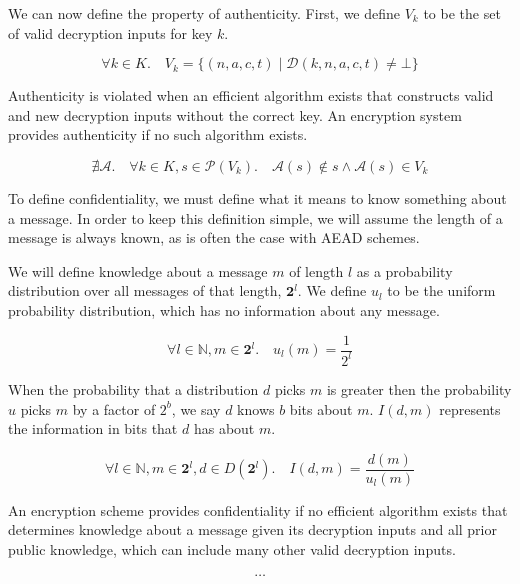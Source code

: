 We can now define the property of authenticity. First, we define $V_k$ to be the
set of valid decryption inputs for key $k$.

\begin{equation}
    \forall k \in K.\quad
    V_k = \{ (n, a, c, t) \mid \mathcal{D}(k, n, a, c, t) \neq \bot \}
\end{equation}

Authenticity is violated when an efficient algorithm exists that constructs
valid and new decryption inputs without the correct key. An encryption system
provides authenticity if no such algorithm exists.

\begin{equation}
    \nexists \mathcal{A}.\quad \forall k \in K, s \in \mathcal{P}(V_k).\quad
    \mathcal{A}(s) \notin s \wedge \mathcal{A}(s) \in V_k
\end{equation}

To define confidentiality, we must define what it means to know something about
a message. In order to keep this definition simple, we will assume the length of
a message is always known, as is often the case with AEAD schemes.

We will define knowledge about a message $m$ of length $l$ as a probability
distribution over all messages of that length, $\mathbf{2}^l$. We define $u_l$
to be the uniform probability distribution, which has no information about any
message.

\begin{equation}
    \forall l \in \mathbb{N}, m \in \mathbf{2}^l.\quad u_l(m) = \frac{1}{2^l}
\end{equation}

When the probability that a distribution $d$ picks $m$ is greater then the
probability $u$ picks $m$ by a factor of $2^b$, we say $d$ knows $b$ bits about
$m$. $I(d, m)$ represents the information in bits that $d$ has about $m$.

\begin{equation}
    \forall l \in \mathbb{N}, m \in \mathbf{2}^l, d \in D(\mathbf{2}^l).\quad
    I(d, m) = \frac{d(m)}{u_l(m)}
\end{equation}

An encryption scheme provides confidentiality if no efficient algorithm exists
that determines knowledge about a message given its decryption inputs and all
prior public knowledge, which can include many other valid decryption inputs.

\begin{equation}
    \dots
\end{equation}


